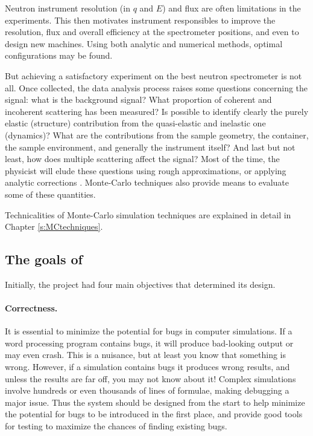 Neutron instrument resolution (in $q$ and $E$) and flux are often limitations in the
experiments. This then motivates instrument responsibles to improve
the resolution, flux and overall efficiency at the spectrometer positions, and
even to design new machines. Using both analytic and numerical
methods, optimal configurations may be found.

But achieving a satisfactory experiment on the best neutron
spectrometer is not all. Once collected, the data analysis process
raises some questions concerning the signal: what is the background
signal? What proportion of coherent and incoherent scattering has
been measured? Is possible to identify clearly the purely elastic
(structure) contribution from the quasi-elastic and inelastic one
(dynamics)? What are the contributions from the sample geometry, the
container, the sample environment, and generally the instrument
itself? And last but not least, how does multiple scattering affect the
signal? Most of the time, the physicist will elude these questions
using rough approximations, or applying analytic corrections
\cite{Copley86}. Monte-Carlo techniques also provide means to evaluate
some of these quantities.

Technicalities of Monte-Carlo simulation
techniques are explained in detail in Chapter \ref{s:MCtechniques}.

\subsection{The goals of \MCS}
\label{s:goals}

Initially, the \MCS project had four main objectives
that determined its design.

\paragraph{Correctness.}
It is essential to minimize the potential for bugs in computer
simulations.  If a word processing program contains bugs, it will
produce bad-looking output or may even crash. This is a nuisance, but at
least you know that something is wrong. However, if a simulation
contains bugs it produces wrong results, and unless the results are far
off, you may not know about it! Complex simulations involve hundreds or
even thousands of lines of formulae, making debugging a major issue. Thus the
system should be designed from the start to help minimize the potential
for bugs to be introduced in the first place, and provide good tools for
testing to maximize the chances of finding existing bugs.
%

